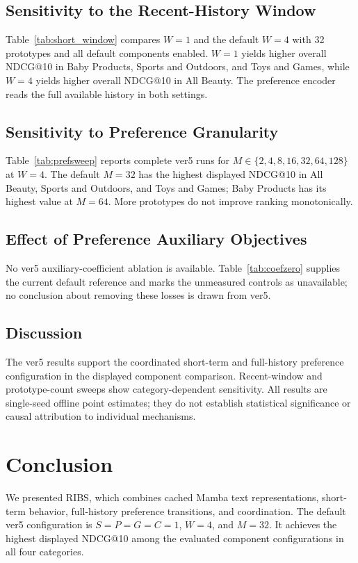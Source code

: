 \documentclass[11pt]{article}
\begin{document}
\subsection{Sensitivity to the Recent-History Window}
Table~\ref{tab:short_window} compares $W=1$ and the default $W=4$ with 32 prototypes and all default components enabled. $W=1$ yields higher overall NDCG@10 in Baby Products, Sports and Outdoors, and Toys and Games, while $W=4$ yields higher overall NDCG@10 in All Beauty. The preference encoder reads the full available history in both settings.

\subsection{Sensitivity to Preference Granularity}
Table~\ref{tab:prefsweep} reports complete ver5 runs for $M\in\{2,4,8,16,32,64,128\}$ at $W=4$. The default $M=32$ has the highest displayed NDCG@10 in All Beauty, Sports and Outdoors, and Toys and Games; Baby Products has its highest value at $M=64$. More prototypes do not improve ranking monotonically.

\subsection{Effect of Preference Auxiliary Objectives}
No ver5 auxiliary-coefficient ablation is available. Table~\ref{tab:coefzero} supplies the current default reference and marks the unmeasured controls as unavailable; no conclusion about removing these losses is drawn from ver5.

\subsection{Discussion}
The ver5 results support the coordinated short-term and full-history preference configuration in the displayed component comparison. Recent-window and prototype-count sweeps show category-dependent sensitivity. All results are single-seed offline point estimates; they do not establish statistical significance or causal attribution to individual mechanisms.

\section{Conclusion}
We presented RIBS, which combines cached Mamba text representations, short-term behavior, full-history preference transitions, and coordination. The default ver5 configuration is $S=P=G=C=1$, $W=4$, and $M=32$. It achieves the highest displayed NDCG@10 among the evaluated component configurations in all four categories.
\end{document}
